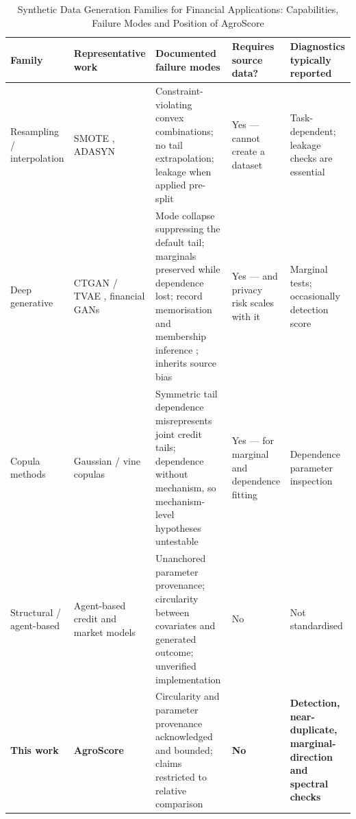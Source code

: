 \documentclass[journal]{IEEEtran}
\begin{document}
\begin{table}[!t]
\caption{Synthetic Data Generation Families for Financial Applications: Capabilities, Failure Modes and Position of AgroScore}
\label{tab:related}
\centering
\footnotesize
\begin{tabular}{@{}p{2.5cm}p{2.9cm}p{4.3cm}p{4.0cm}p{2.4cm}@{}}
\toprule
\textbf{Family} & \textbf{Representative work} & \textbf{Documented failure modes} & \textbf{Requires source data?} & \textbf{Diagnostics typically reported} \\
\midrule
Resampling / inter\-polation & SMOTE \cite{chawla2002smote}, ADASYN \cite{he2008adasyn} &
Constraint-violating convex combinations; no tail extrapolation; leakage when applied pre-split \cite{kapoor2023leakage} &
Yes --- cannot create a dataset & Task-dependent; leakage checks are essential \\
\addlinespace
Deep generative & CTGAN / TVAE \cite{xu2019ctgan}, financial GANs \cite{assefa2020synthetic} &
Mode collapse suppressing the default tail; marginals preserved while dependence lost; record memorisation and membership inference \cite{stadler2022synthetic,shokri2017membership}; inherits source bias &
Yes --- and privacy risk scales with it & Marginal tests; occasionally detection score \\
\addlinespace
Copula methods & Gaussian / vine copulas \cite{joe2014dependence} &
Symmetric tail dependence misrepresents joint credit tails; dependence without mechanism, so mechanism-level hypotheses untestable &
Yes --- for marginal and dependence fitting & Dependence parameter inspection \\
\addlinespace
Structural / agent-based & Agent-based credit and market models \cite{geanakoplos2012abm} &
Unanchored parameter provenance; circularity between covariates and generated outcome; unverified implementation &
No & Not standardised \\
\midrule
\textbf{This work} & \textbf{AgroScore} &
Circularity and parameter provenance acknowledged and bounded; claims restricted to relative comparison &
\textbf{No} & \textbf{Detection, near-duplicate, marginal-direction and spectral checks} \\
\bottomrule
\end{tabular}
\end{table}
\end{document}
